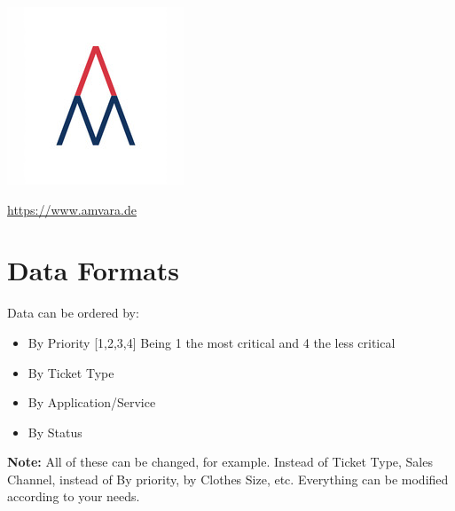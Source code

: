 \documentclass[12pt]{article}
\begin{document}
\maketitle %

\begin{centering} %
	\includegraphics{amvara} \par
	\url{https://www.amvara.de} \par
\end{centering}

\newpage %
\tableofcontents %
\newpage


\section{Data Formats} %
Data can be ordered by:
\begin{itemize} %
	\item By Priority [1,2,3,4] Being 1 the most critical and 4 the less critical
	\item By Ticket Type
	\item By Application/Service
	\item By Status
\end{itemize}
\textbf{Note:} All of these can be changed, for example. Instead of Ticket Type, Sales Channel, instead of By priority, by Clothes Size, etc. Everything can be modified according to your needs.\par
\end{document}
